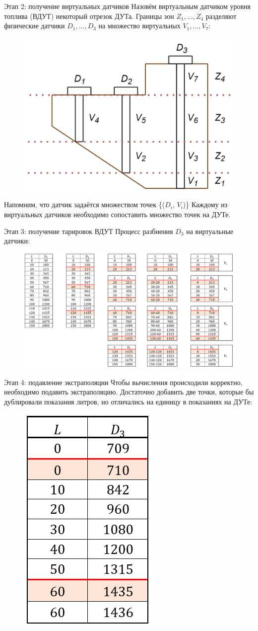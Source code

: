 \documentclass[usenames,dvipsnames,11pt]{beamer}
\begin{document}
\begin{frame}{Этап 2: получение виртуальных датчиков}
	Назовём виртуальным датчиком уровня топлива (ВДУТ) некоторый отрезок ДУТа. Границы зон $Z_1,..., Z_4$ разделяют физические датчики $D_1,...,D_3$ на множество виртуальных $V_1,...,V_7$: 
	\\
	\begin{figure}
		\centering
		\includegraphics[width=0.45\linewidth]{graphics/screenshot008}
	\end{figure}
	Напомним, что датчик задаётся множеством точек \{($D_i$, $V_i$)\} Каждому из виртуальных датчиков необходимо сопоставить множество точек на ДУТе.
\end{frame}

\begin{frame}{Этап 3: получение тарировок ВДУТ}
	Процесс разбиения $D_3$ на виртуальные датчики:
	\begin{figure}
	\includegraphics[width=1.05\linewidth]{graphics/screenshot007}
	\end{figure}
\end{frame}

\begin{frame}{Этап 4: подавление экстраполяции}
	Чтобы вычисления происходили корректно, необходимо подавить экстраполяцию. Достаточно добавить две точки, которые бы дублировали показания литров, но отличались на единицу в показаниях на ДУТе:
	\begin{figure}
		\centering
		\includegraphics[width=0.2\linewidth]{graphics/screenshot009}
	\end{figure}
\end{frame}
\end{document}
